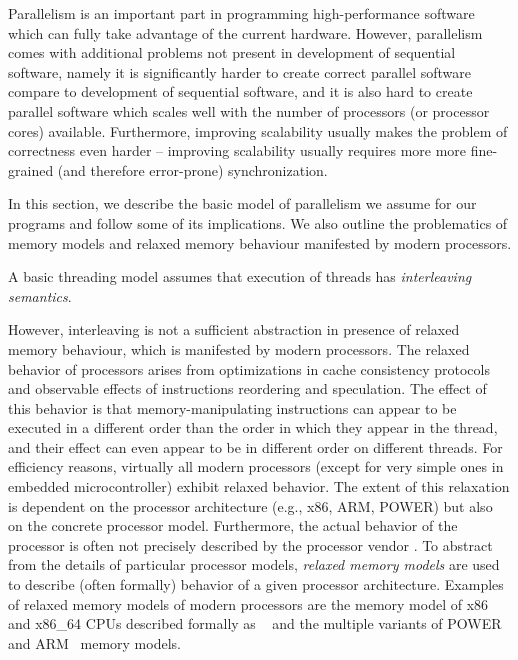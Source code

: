 Parallelism is an important part in programming high-performance software which
can fully take advantage of the current hardware.
However, parallelism comes with additional problems not present in development
of sequential software, namely it is significantly harder to create correct
parallel software compare to development of sequential software, and it is also
hard to create parallel software which scales well with the number of processors
(or processor cores) available.
Furthermore, improving scalability usually makes the problem of correctness even
harder -- improving scalability usually requires more more fine-grained (and
therefore error-prone) synchronization.

In this section, we describe the basic model of parallelism we assume for our
programs and follow some of its implications.
We also outline the problematics of memory models and relaxed memory behaviour
manifested by modern processors.

A basic threading model assumes that execution of threads has \emph{interleaving
semantics}.

\begin{definition}
\end{definition}

However, interleaving is not a sufficient abstraction in presence of relaxed
memory behaviour, which is manifested by modern processors.
The relaxed behavior of processors arises from optimizations in cache
consistency protocols and observable effects of instructions reordering and
speculation.
The effect of this behavior is that memory-manipulating instructions can appear
to be executed in a different order than the order in which they appear in the
thread, and their effect can even appear to be in different order on different
threads.
For efficiency reasons, virtually all modern processors (except for very simple
ones in embedded microcontroller) exhibit relaxed behavior.
The extent of this relaxation is dependent on the processor architecture (e.g.,
x86, ARM, POWER) but also on the concrete processor model.
Furthermore, the actual behavior of the processor is often not precisely
described by the processor vendor \cite{x86tso}.
To abstract from the details of particular processor models, \emph{relaxed
memory models} are used to describe (often formally) behavior of a given
processor architecture.
Examples of relaxed memory models of modern processors are the memory model of
x86 and x86\_64 CPUs described formally as \xtso~\cite{x86tso} and the multiple
variants of POWER~\cite{Sarkar2011,Mador-Haim2012} and
ARM~\cite{Flur2016,Alglave2014,Pulte2017} memory models.

